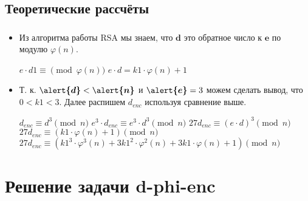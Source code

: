 \documentclass[t]{beamer}
\begin{document}
\subsection{Теоретические рассчёты}
\begin{frame}[t] %
	\frametitle{\insertsection}
	\framesubtitle{\insertsubsection}
	\begin{itemize}
		\item Из алгоритма работы RSA мы знаем, что $\boldsymbol{d}$ это обратное число к $\boldsymbol{e}$ по модулю $\varphi(n)$.\newline
            \begin{center}
                \( e \cdot d1 \equiv \pmod{\varphi(n)} \)\newline
                \( e \cdot d = k1 \cdot \varphi(n) + 1 \)\newline
            \end{center}
            \item Т. к. $\boldsymbol{\alert{d}} < \boldsymbol{\alert{n}}$ и $\boldsymbol{\alert{e}} = 3$ можем сделать вывод, что $0 < k1 < 3$. Далее распишем $d_{enc}$ используя сравнение выше.\newline
            \begin{center}
                \( d_{enc} \equiv d^3 \pmod{n} \)\newline
                \( e^3 \cdot d_{enc} \equiv e^3 \cdot d^3 \pmod{n} \)\newline
                \( 27d_{enc} \equiv (e \cdot d)^3 \pmod{n} \)\newline
                \( 27d_{enc} \equiv (k1 \cdot \varphi(n) +1) \pmod{n} \)\newline
                \( 27d_{enc} \equiv (k1^3 \cdot \varphi^3(n) + 3k1^2 \cdot \varphi^2(n) + 3k1 \cdot \varphi(n) + 1) \pmod{n} \)\newline
		\end{center}
	\end{itemize}
\end{frame}

\section{Решение задачи d-phi-enc}
\end{document}
